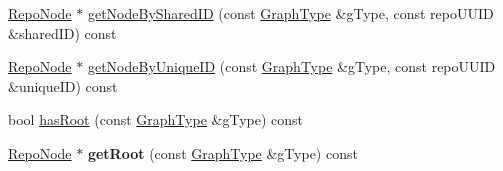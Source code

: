 \begin{DoxyCompactItemize}
\item 
\hyperlink{classrepo_1_1core_1_1model_1_1_repo_node}{Repo\+Node} $\ast$ \hyperlink{classrepo_1_1core_1_1model_1_1_repo_scene_ada8d3c259b08a83a2f80b3337b95416d}{get\+Node\+By\+Shared\+I\+D} (const \hyperlink{classrepo_1_1core_1_1model_1_1_repo_scene_aefcacd6eb4c7774ac1bfe3a6b223337c}{Graph\+Type} \&g\+Type, const repo\+U\+U\+I\+D \&shared\+I\+D) const 
\item 
\hyperlink{classrepo_1_1core_1_1model_1_1_repo_node}{Repo\+Node} $\ast$ \hyperlink{classrepo_1_1core_1_1model_1_1_repo_scene_aa15d3e1283014d74816e2aaaec2896f6}{get\+Node\+By\+Unique\+I\+D} (const \hyperlink{classrepo_1_1core_1_1model_1_1_repo_scene_aefcacd6eb4c7774ac1bfe3a6b223337c}{Graph\+Type} \&g\+Type, const repo\+U\+U\+I\+D \&unique\+I\+D) const 
\item 
bool \hyperlink{classrepo_1_1core_1_1model_1_1_repo_scene_a089803365c0d98a9050f36fc0b7b24e4}{has\+Root} (const \hyperlink{classrepo_1_1core_1_1model_1_1_repo_scene_aefcacd6eb4c7774ac1bfe3a6b223337c}{Graph\+Type} \&g\+Type) const 
\item 
\hypertarget{classrepo_1_1core_1_1model_1_1_repo_scene_a29df82d7ec425aeac62bb23c0e5a04a9}{}\hyperlink{classrepo_1_1core_1_1model_1_1_repo_node}{Repo\+Node} $\ast$ {\bfseries get\+Root} (const \hyperlink{classrepo_1_1core_1_1model_1_1_repo_scene_aefcacd6eb4c7774ac1bfe3a6b223337c}{Graph\+Type} \&g\+Type) const \label{classrepo_1_1core_1_1model_1_1_repo_scene_a29df82d7ec425aeac62bb23c0e5a04a9}


\end{DoxyCompactItemize}
